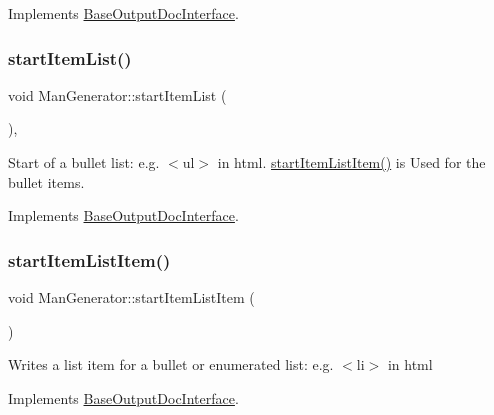 Implements \mbox{\hyperlink{class_base_output_doc_interface_ab52dbf41ce337c701f9cd1e7794f80e7}{Base\+Output\+Doc\+Interface}}.

\mbox{\label{class_man_generator_a5b29aa8c2dd69237fd7470df129fc4e3}} 
\subsubsection{\texorpdfstring{startItemList()}{startItemList()}}
{\footnotesize\ttfamily void Man\+Generator\+::start\+Item\+List (\begin{DoxyParamCaption}{ }\end{DoxyParamCaption})\hspace{0.3cm}{\ttfamily [inline]}, {\ttfamily [virtual]}}

Start of a bullet list\+: e.\+g. {\ttfamily $<$ul$>$} in html. \mbox{\hyperlink{class_man_generator_a83d776971ea058ea021d49df05f4e563}{start\+Item\+List\+Item()}} is Used for the bullet items. 

Implements \mbox{\hyperlink{class_base_output_doc_interface_a54b169393594b6cf113977ccccaeb9ee}{Base\+Output\+Doc\+Interface}}.

\mbox{\label{class_man_generator_a83d776971ea058ea021d49df05f4e563}} 
\subsubsection{\texorpdfstring{startItemListItem()}{startItemListItem()}}
{\footnotesize\ttfamily void Man\+Generator\+::start\+Item\+List\+Item (\begin{DoxyParamCaption}{ }\end{DoxyParamCaption})\hspace{0.3cm}{\ttfamily [virtual]}}

Writes a list item for a bullet or enumerated list\+: e.\+g. {\ttfamily $<$li$>$} in html 

Implements \mbox{\hyperlink{class_base_output_doc_interface_aa1cbcadfedf8e6d52029d17526b5fa3f}{Base\+Output\+Doc\+Interface}}.

\mbox{\label{class_man_generator_a311b0dd8edecddbfa0473c5e43a97e73}} 
